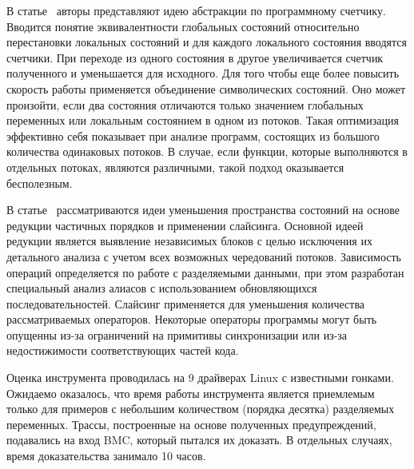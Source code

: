 В статье~\cite{Basler:2009} авторы представляют идею абстракции по программному счетчику.
Вводится понятие эквивалентности глобальных состояний относительно перестановки локальных состояний и для каждого локального состояния вводятся счетчики.
При переходе из одного состояния в другое увеличивается счетчик полученного и уменьшается для исходного. 
Для того чтобы еще более повысить скорость работы применяется объединение символических состояний.
Оно может произойти, если два состояния отличаются только значением глобальных переменных или локальным состоянием в одном из потоков. 
Такая оптимизация эффективно себя показывает при анализе программ, состоящих из большого количества одинаковых потоков.
В случае, если функции, которые выполняются в отдельных потоках, являются различными, такой подход оказывается бесполезным.


В статье~\cite{Kahlon:2009:SRTI} рассматриваются идеи уменьшения пространства состояний на основе редукции частичных порядков и применении слайсинга.
Основной идеей редукции является выявление независимых блоков с целью исключения их детального анализа с учетом всех возможных чередований потоков.
Зависимость операций определяется по работе с разделяемыми данными, при этом разработан специальный анализ алиасов с использованием обновляющихся последовательностей.
Слайсинг применяется для уменьшения количества рассматриваемых операторов. Некоторые операторы программы могут быть опущенны из-за ограничений на примитивы синхронизации или из-за недостижимости соответствующих частей кода.

Оценка инструмента проводилась на 9 драйверах Linux с известными гонками. Ожидаемо оказалось, что время работы инструмента является приемлемым только для примеров с небольшим количеством (порядка десятка) разделяемых переменных.
Трассы, построенные на основе полученных предупреждений, подавались на вход BMC, который пытался их доказать. В отдельных случаях, время доказательства занимало 10 часов. 

